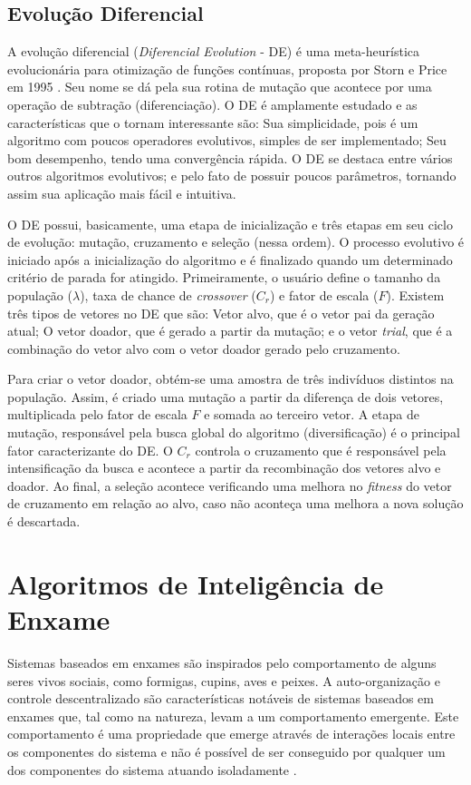\subsection{Evolução Diferencial}
\label{sec:diferencial_evolution}
A evolução diferencial (\textit{Diferencial Evolution} - DE) é uma meta-heurística evolucionária para otimização de funções contínuas, proposta por Storn e Price em 1995 \cite{de}. Seu nome se dá pela sua rotina de mutação que acontece por uma operação de subtração (diferenciação). O DE é amplamente estudado e as características que o tornam interessante são: Sua simplicidade, pois é um algoritmo com poucos operadores evolutivos, simples de ser implementado; Seu bom desempenho, tendo uma convergência rápida. O DE se destaca entre vários outros algoritmos evolutivos; e pelo fato de possuir poucos parâmetros, tornando assim sua aplicação mais fácil e intuitiva.

O DE possui, basicamente, uma etapa de inicialização e três etapas em seu ciclo de evolução: mutação, cruzamento e seleção (nessa ordem). O processo evolutivo é iniciado após a inicialização do algoritmo e é finalizado quando um determinado critério de parada for atingido. Primeiramente, o usuário define o tamanho da população ($\lambda$), taxa de chance de \textit{crossover} ($C_r$) e fator de escala ($F$). Existem três tipos de vetores no DE que são: Vetor alvo, que é o vetor pai da geração atual; O vetor doador, que é gerado a partir da mutação; e o vetor \textit{trial}, que é a combinação do vetor alvo com o vetor doador gerado pelo cruzamento. 

Para criar o vetor doador, obtém-se uma amostra de três indivíduos distintos na população. Assim, é criado uma mutação a partir da diferença de dois vetores, multiplicada pelo fator de escala $F$ e somada ao terceiro vetor. A etapa de mutação, responsável pela busca global do algoritmo (diversificação) é o principal fator caracterizante do DE. O $C_r$ controla o cruzamento que é responsável pela intensificação da busca e acontece a partir da recombinação dos vetores alvo e doador. Ao final, a seleção acontece verificando uma melhora no \textit{fitness} do vetor de cruzamento em relação ao alvo, caso não aconteça uma melhora a nova solução é descartada.

\section{Algoritmos de Inteligência de Enxame}
\label{sec:swarm_intelligence_algorithms}
Sistemas baseados em enxames são inspirados pelo comportamento de alguns seres vivos sociais, como formigas, cupins, aves e peixes. A auto-organização e controle descentralizado são características notáveis de sistemas baseados em enxames que, tal como na natureza, levam a um comportamento emergente. Este comportamento é uma propriedade que emerge através de interações locais entre os componentes do sistema e não é possível de ser conseguido por qualquer um dos componentes do sistema atuando isoladamente \cite{garnier2007biological}.

